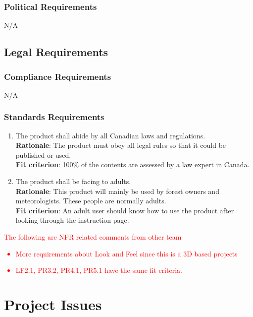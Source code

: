 \documentclass{article}
\begin{document}
\subsubsection{Political Requirements}
N/A
\subsection{Legal Requirements}
\subsubsection{Compliance Requirements}
N/A
\subsubsection{Standards Requirements}
\begin{enumerate}[LR2.1]
    \item The product shall abide by all Canadian laws and regulations.\\
    \textbf{Rationale}: The product must obey all legal rules so that it could be published or used.\\
    \textbf{Fit criterion}: 100\% of the contents are assessed by a law expert in Canada.\\
    \item The product shall be facing to adults.\\
    \textbf{Rationale}: This product will mainly be used by forest 
    owners and meteorologists. These people are normally adults. \\ 
    \textbf{Fit criterion}: An adult user should know how to use
    the product after looking through the instruction page.\\
\end{enumerate}

\textcolor{red}{
The following are NFR related comments from other team
\begin{itemize}
\item More requirements about Look and Feel since this is a 3D based projects
\item LF2.1, PR3.2, PR4.1, PR5.1 have the same fit criteria.
\end{itemize} 
}




\section{Project Issues}
\end{document}
